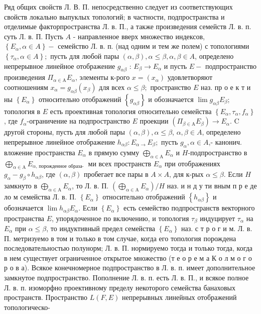 \documentclass[10pt]{article}
\begin{document}
Ряд общих свойств Л. В. П. непосредственно следует из соответствующих свойств локально выпуклых топологий; в частности, подпространства и отделимые факторпространства Л. в. П., а также произведения семейств Л. в. п. суть Л. в. П. Пусть $A$ - направленное вверх множество индексов, $\left\{E_{\alpha}, \alpha \in A\right\}-$ семейство Л. в. п. (над одним и тем же полем) с топологиями $\left\{\tau_{\alpha}, \alpha \in A\right\} ;$ пусть для любой пары $(\alpha, \beta), \alpha \leqslant \beta, \alpha, \beta \in A$, определено непрерывное линейное отображение $g_{\alpha \beta}$ : $E_{\beta} \rightarrow E_{\alpha}$ и пусть $E-$ подпространство произведения $\Pi_{\alpha \in \mathrm{A}} E_{\alpha}$, элементы к-рого $x=\left(x_{\alpha}\right)$ удовлетворяют соотношениям $x_{\alpha}=g_{\alpha \beta}\left(x_{\beta}\right)$ для всех $\alpha \leqslant \beta ;$ пространство $E$ наз. пр о е к т и ны $\left\{E_{\alpha}\right\}$ относительно отображений $\left\{g_{\alpha \beta}\right\}$ и обозначается $\lim g_{\alpha \beta} E_{\beta}$; топология в $E$ есть проективная топология относительно семейства $\left\{E_{\alpha}, \tau_{\alpha}, f_{\alpha}\right\}$, где $f_{\alpha}$-ограничение на подпространство $E$ проекции $\left(\Pi_{\beta \in \mathrm{A}} E_{\beta}\right) \rightarrow E_{\alpha}$. C другой стороны, пусть для любой пары $(\alpha, \beta), \alpha \leqslant \beta$, $\alpha, \beta \in A$, определено непрерывное линейное отображение $h_{\alpha \beta}: E_{\alpha \rightarrow} E_{\beta} ;$ пусть $g_{\alpha}, \alpha \in A$,- канонич. вложение пространства $E_{\alpha}$ в прямую сумму $\bigoplus_{\alpha \in \mathrm{A}} E_{\alpha}$ и $H$-подпространство в $\bigoplus_{\alpha \in \mathrm{A}} E_{\alpha \text {, порожденное образа- }}$ ми всех пространств $E_{\alpha}$ при отображениях $g_{\alpha}-g_{\beta} \circ h_{\alpha \beta}$, где $(\alpha, \beta)$ пробегает все пары в $A \times A$, для к-рых $\alpha \leqslant \beta$. Если $H$ замкнуто в $\bigoplus_{\alpha \in \mathrm{A}} E_{\alpha}$, то Л. в. П. $\left(\bigoplus_{\alpha \in \mathrm{A}} E_{\alpha}\right) / H$ наз. и н д у ти вным п р е де ло м семейства Л. в. П. $\left\{E_{\alpha}\right\}$ относительно отображений $\left\{h_{\alpha \beta}\right\}$ и обозначается $\lim h_{\alpha \beta} E_{\alpha}$. Если $\left\{E_{\alpha}\right\}$ есть семейство подпространств векторного пространства $E$, упорядоченное по включению, и топология $\tau_{\beta}$ индуцирует $\tau_{\alpha}$ на $E_{\alpha}$ при $\alpha \leqslant \beta$, то индуктивный предел семейства $\left\{E_{\alpha}\right\}$ наз. с т р о г и м. Л. в. П. метризуемо в том и только в том случае, когда его топология порождена последовательностью полунорм; Л. в. П. нормируемо тогда и только тогда, когда в нем существует ограниченное открытое множество (т е о р е м а К о л м о г о р о в а). Всякое конечномерное подпространство в Л. в. п. имеет дополнительное замкнутое подпространство. Пополнение Л. в. п. есть Л. в. П., и всякое полное Л. в. п. изоморфно проективному пределу некоторого семейства банаховых пространств. Пространство $L(F, E)$ непрерывных линейных отображений топологическо-
\end{document}
